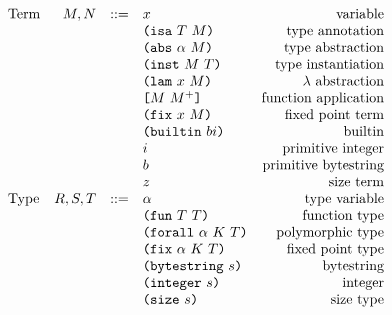 \documentclass[../main.tex]{subfiles}
\begin{document}
\begin{figure*}[t]
    \centering
    \[\begin{array}{lrclr}
        \textrm{Term}             & M, N   & ::= & x                       & \textrm{variable}\\
                                  &     &     & \ann{M}{T}                 & \textrm{type annotation}\\
                                  &     &     & \abs{\alpha}{M}            & \textrm{type abstraction}\\
                                  &     &     & \inst{M}{T}                & \textrm{type instantiation}\\
                                  &     &     & \lam{x}{M}                 & \textrm{$\lambda$ abstraction}\\
                                  &     &     & \app{M}{M^+}               & \textrm{function application}\\
                                  &     &     & \fix{x}{M}                 & \textrm{fixed point term}\\
                                  &     &     & \builtin{bi}               & \textrm{builtin}\\
                                  &     &     & i                          & \textrm{primitive integer}\\
                                  &     &     & b                          & \textrm{primitive bytestring}\\
                                  &     &     & z                          & \textrm{size term}\\
        \textrm{Type}             & R,S,T & ::= & \alpha                     & \textrm{type variable}\\
                                  &     &     & \funT{T}{T}                & \textrm{function type}\\
                                  &     &     & \forallT{\alpha}{K}{T}     & \textrm{polymorphic type}\\
                                  &     &     & \fixT{\alpha}{K}{T}        & \textrm{fixed point type}\\
                                  &     &     & \bytestringT{s}            & \textrm{bytestring}\\
                                  &     &     & \integerT{s}               & \textrm{integer}\\
                                  &     &     & \sizeT{s}                  & \textrm{size type}\\

\end{array}\]
\end{figure*}
\end{document}
